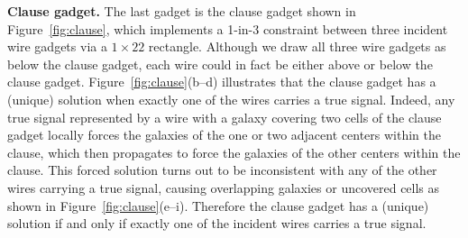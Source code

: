 \textbf{Clause gadget.}
The last gadget is the clause gadget shown in Figure~\ref{fig:clause},
which implements a 1-in-3 constraint between three incident wire gadgets
via a $1 \times 22$ rectangle.
Although we draw all three wire gadgets as below the clause gadget,
each wire could in fact be either above or below the clause gadget.
Figure~\ref{fig:clause}(b--d) illustrates that the clause gadget has a
(unique) solution when exactly one of the wires carries a true signal.
Indeed, any true signal represented by a wire with a galaxy covering
two cells of the clause gadget locally forces the galaxies of the
one or two adjacent centers within the clause, which then propagates to force
the galaxies of the other centers within the clause.
This forced solution turns out to be inconsistent with
any of the other wires carrying a true signal, causing overlapping galaxies
or uncovered cells as shown in Figure~\ref{fig:clause}(e--i).
Therefore the clause gadget has a (unique) solution if and only if
exactly one of the incident wires carries a true signal.

%

